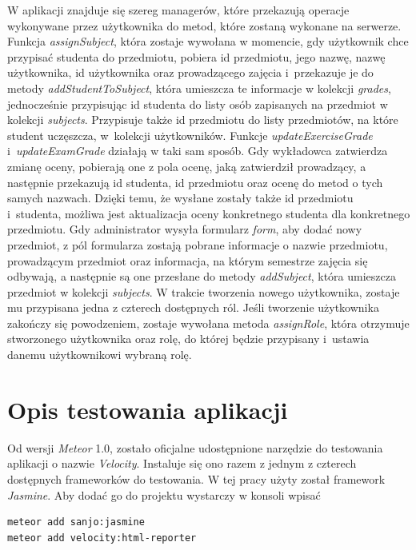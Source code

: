 \documentclass[openright]{xmgr}
\begin{document}
W aplikacji znajduje się szereg managerów, które przekazują operacje wykonywane przez użytkownika do metod, które zostaną wykonane na serwerze. Funkcja \textit{assignSubject}, która zostaje wywołana w momencie, gdy użytkownik chce przypisać studenta do przedmiotu, pobiera id przedmiotu, jego nazwę, nazwę użytkownika, id użytkownika oraz prowadzącego zajęcia i~przekazuje je do metody \textit{addStudentToSubject}, która umieszcza te informacje w kolekcji \textit{grades}, jednocześnie przypisując id studenta do listy osób zapisanych na przedmiot w kolekcji \textit{subjects}. Przypisuje także id przedmiotu do listy przedmiotów, na które student uczęszcza, w~kolekcji użytkowników. Funkcje \textit{updateExerciseGrade} i~\textit{updateExamGrade} działają w taki sam sposób. Gdy wykładowca zatwierdza zmianę oceny, pobierają one z pola ocenę, jaką zatwierdził prowadzący, a następnie przekazują id studenta, id przedmiotu oraz ocenę do metod o tych samych nazwach. Dzięki temu, że wysłane zostały także id przedmiotu i~studenta, możliwa jest aktualizacja oceny konkretnego studenta dla konkretnego przedmiotu. Gdy administrator wysyła formularz \textit{form}, aby dodać nowy przedmiot, z pól formularza zostają pobrane informacje o nazwie przedmiotu, prowadzącym przedmiot oraz informacja, na którym semestrze zajęcia się odbywają, a następnie są one przesłane do metody \textit{addSubject}, która umieszcza przedmiot w kolekcji \textit{subjects}. W trakcie tworzenia nowego użytkownika, zostaje mu przypisana jedna z czterech dostępnych ról. Jeśli tworzenie użytkownika zakończy się powodzeniem, zostaje wywołana metoda \textit{assignRole}, która otrzymuje stworzonego użytkownika oraz rolę, do której będzie przypisany i~ustawia danemu użytkownikowi wybraną rolę.

\cite{Introduction}
\cite{MeteorDocs}
\cite{MongoDocs}
\cite{ScalingMongoDB2011}
\cite{ScalingWithMongoDB}
\section{Opis testowania aplikacji}
\indent \indent \indent Od wersji \textit{Meteor} 1.0, zostało oficjalne udostępnione narzędzie do testowania aplikacji o nazwie \textit{Velocity}. Instaluje się ono razem z jednym z czterech dostępnych frameworków do testowania. W tej pracy użyty został framework \textit{Jasmine}. Aby dodać go do projektu wystarczy w konsoli wpisać

\begin{lstlisting}[language=bash,caption={Instalacja Velocity, Jasmine i~html reporter}]
meteor add sanjo:jasmine
meteor add velocity:html-reporter
\end{lstlisting}
\end{document}
